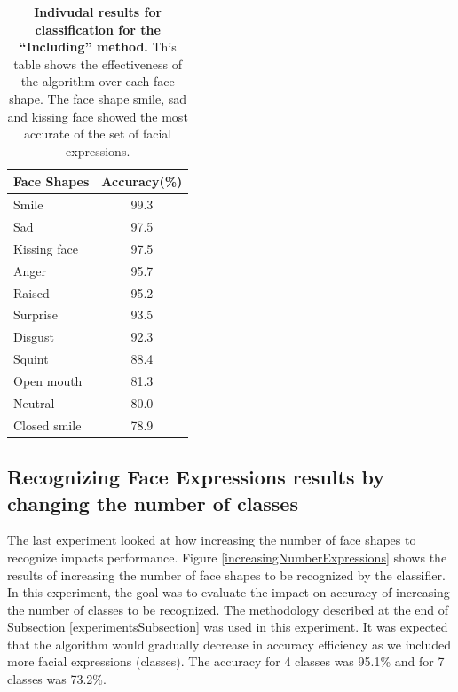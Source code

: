 \documentclass[]{article}
\begin{document}
\begin{table}[t]
\centering
\begin{tabular}{|l|c|}
\hline
Face Shapes & Accuracy(\%) \\ \hline
Smile & 99.3\\\hline
Sad & 97.5\\\hline
Kissing face & 97.5\\\hline
Anger & 95.7\\\hline
Raised & 95.2\\\hline
Surprise & 93.5\\\hline
Disgust & 92.3\\\hline
Squint & 88.4\\\hline
Open mouth & 81.3\\\hline
Neutral & 80.0\\\hline
Closed smile & 78.9\\\hline
\end{tabular}
\caption{\textbf{Indivudal results for classification for the ``Including''
method.} This table shows the effectiveness of the algorithm over each face
shape. The face shape smile, sad and kissing face showed the most accurate of the set of facial expressions.}
\label{rankIn}
\end{table}



 
\subsection{Recognizing Face Expressions results by changing the number of classes}
The last experiment looked at how increasing the number of face shapes to recognize impacts performance. Figure
\ref{increasingNumberExpressions} shows the results of increasing the number of face shapes to be recognized by the
classifier. In this experiment, the goal was to evaluate the impact on accuracy of increasing  the number of classes to
be recognized. The methodology described at the end of Subsection \ref{experimentsSubsection} was used in this
experiment. It was expected that the algorithm would gradually decrease in accuracy efficiency as we included more
facial expressions (classes). The accuracy for 4 classes was 95.1\% and for 7 classes was 73.2\%.
\end{document}
